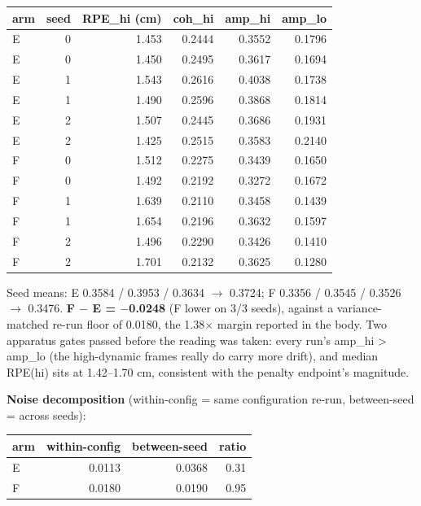 \begin{table}[t]\centering\scriptsize\setlength{\tabcolsep}{3.5pt}
\begin{tabular}{lrrrrr}\toprule
arm & seed & RPE\_hi (cm) & coh\_hi & amp\_hi & amp\_lo \\ \midrule
E & 0 & 1.453 & 0.2444 & 0.3552 & 0.1796 \\
E & 0 & 1.450 & 0.2495 & 0.3617 & 0.1694 \\
E & 1 & 1.543 & 0.2616 & 0.4038 & 0.1738 \\
E & 1 & 1.490 & 0.2596 & 0.3868 & 0.1814 \\
E & 2 & 1.507 & 0.2445 & 0.3686 & 0.1931 \\
E & 2 & 1.425 & 0.2515 & 0.3583 & 0.2140 \\
F & 0 & 1.512 & 0.2275 & 0.3439 & 0.1650 \\
F & 0 & 1.492 & 0.2192 & 0.3272 & 0.1672 \\
F & 1 & 1.639 & 0.2110 & 0.3458 & 0.1439 \\
F & 1 & 1.654 & 0.2196 & 0.3632 & 0.1597 \\
F & 2 & 1.496 & 0.2290 & 0.3426 & 0.1410 \\
F & 2 & 1.701 & 0.2132 & 0.3625 & 0.1280 \\
\bottomrule\end{tabular}\end{table}

Seed means: E 0.3584 / 0.3953 / 0.3634 $\rightarrow$ 0.3724; F 0.3356 / 0.3545 / 0.3526 $\rightarrow$ 0.3476. \textbf{F $-$ E = $-$0.0248} (F lower on 3/3 seeds), against a variance-matched re-run floor of 0.0180, the 1.38$\times$ margin reported in the body. Two apparatus gates passed before the reading was taken: every run's amp\_hi > amp\_lo (the high-dynamic frames really do carry more drift), and median RPE(hi) sits at 1.42--1.70 cm, consistent with the penalty endpoint's magnitude.


\textbf{Noise decomposition} (within-config = same configuration re-run, between-seed = across seeds):


\begin{table}[t]\centering\footnotesize
\begin{tabular}{lrrr}\toprule
arm & within-config & between-seed & ratio \\ \midrule
E & 0.0113 & 0.0368 & 0.31 \\
F & 0.0180 & 0.0190 & 0.95 \\
\bottomrule\end{tabular}\end{table}

